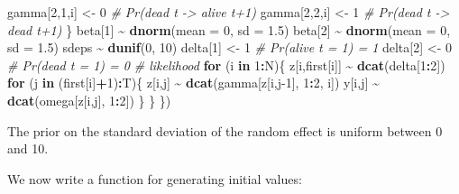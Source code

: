 \documentclass[
  12pt,
]{krantz}
\newenvironment{Shaded}{\begin{snugshade}}{\end{snugshade}}
\newcommand{\AttributeTok}[1]{\textcolor[rgb]{0.13,0.29,0.53}{#1}}
\newcommand{\CommentTok}[1]{\textcolor[rgb]{0.56,0.35,0.01}{\textit{#1}}}
\newcommand{\ControlFlowTok}[1]{\textcolor[rgb]{0.13,0.29,0.53}{\textbf{#1}}}
\newcommand{\DecValTok}[1]{\textcolor[rgb]{0.00,0.00,0.81}{#1}}
\newcommand{\FloatTok}[1]{\textcolor[rgb]{0.00,0.00,0.81}{#1}}
\newcommand{\FunctionTok}[1]{\textcolor[rgb]{0.13,0.29,0.53}{\textbf{#1}}}
\newcommand{\NormalTok}[1]{#1}
\newcommand{\OtherTok}[1]{\textcolor[rgb]{0.56,0.35,0.01}{#1}}
\newcommand{\SpecialCharTok}[1]{\textcolor[rgb]{0.81,0.36,0.00}{\textbf{#1}}}
\begin{document}
\begin{Shaded}
\begin{Highlighting}[]
\NormalTok{    gamma[}\DecValTok{2}\NormalTok{,}\DecValTok{1}\NormalTok{,i] }\OtherTok{\textless{}{-}} \DecValTok{0}           \CommentTok{\# Pr(dead t {-}\textgreater{} alive t+1)}
\NormalTok{    gamma[}\DecValTok{2}\NormalTok{,}\DecValTok{2}\NormalTok{,i] }\OtherTok{\textless{}{-}} \DecValTok{1}           \CommentTok{\# Pr(dead t {-}\textgreater{} dead t+1)}
\NormalTok{  \}}
\NormalTok{  beta[}\DecValTok{1}\NormalTok{] }\SpecialCharTok{\textasciitilde{}} \FunctionTok{dnorm}\NormalTok{(}\AttributeTok{mean =} \DecValTok{0}\NormalTok{, }\AttributeTok{sd =} \FloatTok{1.5}\NormalTok{)}
\NormalTok{  beta[}\DecValTok{2}\NormalTok{] }\SpecialCharTok{\textasciitilde{}} \FunctionTok{dnorm}\NormalTok{(}\AttributeTok{mean =} \DecValTok{0}\NormalTok{, }\AttributeTok{sd =} \FloatTok{1.5}\NormalTok{)}
\NormalTok{  sdeps }\SpecialCharTok{\textasciitilde{}} \FunctionTok{dunif}\NormalTok{(}\DecValTok{0}\NormalTok{, }\DecValTok{10}\NormalTok{)}
\NormalTok{  delta[}\DecValTok{1}\NormalTok{] }\OtherTok{\textless{}{-}} \DecValTok{1}                 \CommentTok{\# Pr(alive t = 1) = 1}
\NormalTok{  delta[}\DecValTok{2}\NormalTok{] }\OtherTok{\textless{}{-}} \DecValTok{0}                 \CommentTok{\# Pr(dead t = 1) = 0}
  \CommentTok{\# likelihood}
  \ControlFlowTok{for}\NormalTok{ (i }\ControlFlowTok{in} \DecValTok{1}\SpecialCharTok{:}\NormalTok{N)\{}
\NormalTok{    z[i,first[i]] }\SpecialCharTok{\textasciitilde{}} \FunctionTok{dcat}\NormalTok{(delta[}\DecValTok{1}\SpecialCharTok{:}\DecValTok{2}\NormalTok{])}
    \ControlFlowTok{for}\NormalTok{ (j }\ControlFlowTok{in}\NormalTok{ (first[i]}\SpecialCharTok{+}\DecValTok{1}\NormalTok{)}\SpecialCharTok{:}\NormalTok{T)\{}
\NormalTok{      z[i,j] }\SpecialCharTok{\textasciitilde{}} \FunctionTok{dcat}\NormalTok{(gamma[z[i,j}\DecValTok{{-}1}\NormalTok{], }\DecValTok{1}\SpecialCharTok{:}\DecValTok{2}\NormalTok{, i])}
\NormalTok{      y[i,j] }\SpecialCharTok{\textasciitilde{}} \FunctionTok{dcat}\NormalTok{(omega[z[i,j], }\DecValTok{1}\SpecialCharTok{:}\DecValTok{2}\NormalTok{])}
\NormalTok{    \}}
\NormalTok{  \}}
\NormalTok{\})}
\end{Highlighting}
\end{Shaded}

The prior on the standard deviation of the random effect is uniform between 0 and 10.

We now write a function for generating initial values:
\end{document}

